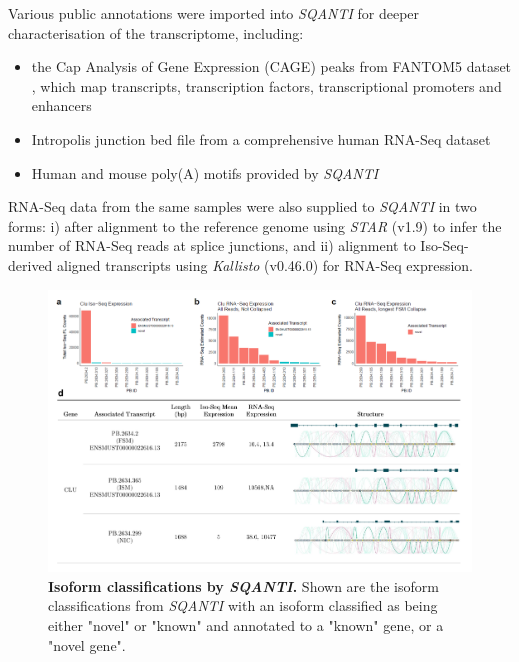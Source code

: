 Various public annotations were imported into \textit{SQANTI} for deeper characterisation of the transcriptome, including:
\begin{itemize}
	\item the Cap Analysis of Gene Expression (CAGE) peaks from FANTOM5 dataset \cite{Lizio2019}, which map transcripts, transcription factors, transcriptional promoters and enhancers
	\item Intropolis junction bed file\cite{Nellore2016} from a comprehensive human RNA-Seq dataset
	\item Human and mouse poly(A) motifs provided by \textit{SQANTI}	 
\end{itemize}

RNA-Seq data from the same samples were also supplied to \textit{SQANTI} in two forms: i) after alignment to the reference genome using \textit{STAR}\cite{Dobin2013} (v1.9) to infer the number of RNA-Seq reads at splice junctions, and ii) alignment to Iso-Seq-derived aligned transcripts using \textit{Kallisto}\cite{Bray2016} (v0.46.0) for RNA-Seq expression.  

\begin{landscape}
	\begin{figure}[h]
		\centering
		\includegraphics[page=3,trim={0 4cm 0 0},clip,scale = 0.9]{Figures/ProjectDevelopment_Figures_Landscape}
		\captionsetup{width=1.5\textwidth}
		\caption[Isoform classifications by \textit{SQANTI}]%
		{\textbf{Isoform classifications by \textit{SQANTI}.} Shown are the isoform classifications from \textit{SQANTI} with an isoform classified as being either "novel" or "known" and annotated to a "known" gene, or a "novel gene".}
		\label{fig:sqanti_cate}
	\end{figure}
\end{landscape}

